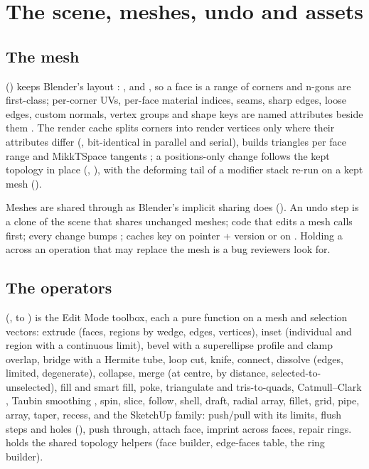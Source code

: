 \chapter{The scene, meshes, undo and assets}
\label{ch:scene}

\section{The mesh}
 () keeps Blender's layout \cite{Blender2026}: , 
and , so a face is a range of corners and n-gons are first-class; per-corner UVs, per-face material
indices, seams, sharp edges, loose edges, custom normals, vertex groups and shape keys are named attributes beside them
\cite{MarschnerShirley2021}. The render cache splits corners into render vertices only where their attributes differ
(, bit-identical in parallel and serial), builds triangles per face range and MikkTSpace
tangents \cite{Mikkelsen2008Simulation}; a positions-only change follows the kept topology in place
(, ), with the deforming tail of a modifier stack re-run on a kept mesh ().

Meshes are shared through  as Blender's implicit sharing does (). An undo step is a clone of the
scene that shares unchanged meshes; code that edits a mesh calls  first; every change bumps
; caches key on pointer + version or on . Holding a  across an
operation that may replace the mesh is a bug reviewers look for.

\section{The operators}
 (,  to ) is the Edit Mode toolbox,
each a pure function on a mesh and selection vectors: extrude (faces, regions by wedge, edges, vertices), inset
(individual and region with a continuous limit), bevel with a superellipse profile and clamp overlap, bridge with a
Hermite tube, loop cut, knife, connect, dissolve (edges, limited, degenerate), collapse, merge (at centre, by distance,
selected-to-unselected), fill and smart fill, poke, triangulate and tris-to-quads, Catmull--Clark
\cite{Catmull1978Recursively}, Taubin smoothing \cite{Taubin1995Signal}, spin, slice, follow, shell, draft, radial
array, fillet, grid, pipe, array, taper, recess, and the SketchUp family: push/pull with its limits, flush steps and
holes (), push through, attach face, imprint across faces, repair rings. 
holds the shared topology helpers (face builder, edge-faces table, the  ring builder).

